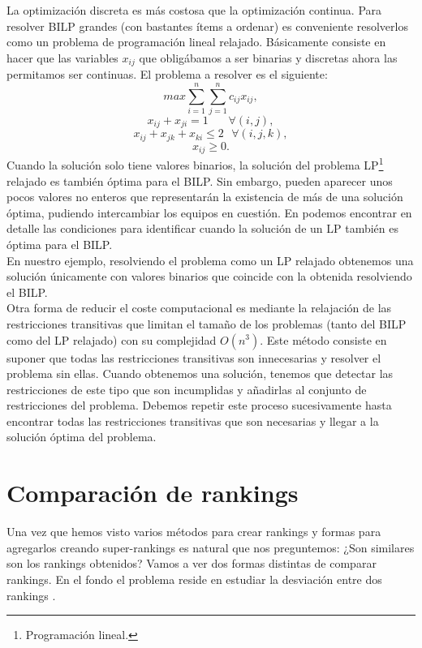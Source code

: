 La optimización discreta es más costosa que la optimización continua. Para resolver BILP grandes (con bastantes ítems a ordenar) es conveniente resolverlos como un problema de programación lineal relajado. Básicamente consiste en hacer que las variables $x_{ij}$ que obligábamos a ser binarias y discretas ahora las permitamos ser continuas. El problema a resolver es el siguiente:
\begin{equation} \label{optprob2}
	max \sum_{i=1}^{n} \sum_{j=1}^{n} c_{ij} x_{ij},
\end{equation}
\begin{equation*}
	x_{ij} + x_{ji} = 1 \ \ \ \ \ \ \ \ \forall (i,j),
\end{equation*}
\begin{equation*}
	x_{ij} + x_{jk} + x_{ki} \leq 2 \ \ \ \forall (i,j,k),
\end{equation*}
\begin{equation*}
	x_{ij} \geq 0.
\end{equation*}
Cuando la solución solo tiene valores binarios, la solución del problema LP\footnote{Programación lineal.} relajado es también óptima para el BILP. Sin embargo, pueden aparecer unos pocos valores no enteros que representarán la existencia de más de una solución óptima, pudiendo intercambiar los equipos en cuestión. En \cite[Chapter 4]{refbilp} podemos encontrar en detalle las condiciones para identificar cuando la solución de un LP también es óptima para el BILP.\\

En nuestro ejemplo, resolviendo el problema como un LP relajado obtenemos una solución únicamente con valores binarios que coincide con la obtenida resolviendo el BILP. \\

Otra forma de reducir el coste computacional es mediante la relajación de las restricciones transitivas que limitan el tamaño de los problemas (tanto del BILP como del LP relajado) con su complejidad $O(n^{3})$. Este método consiste en suponer que todas las restricciones transitivas son innecesarias y resolver el problema sin ellas. Cuando obtenemos una solución, tenemos que detectar las restricciones de este tipo que son incumplidas y añadirlas al conjunto de restricciones del problema. Debemos repetir este proceso sucesivamente hasta encontrar todas las restricciones transitivas que son necesarias y llegar a la solución óptima del problema.\\


\section{Comparación de rankings}
Una vez que hemos visto varios métodos para crear rankings y formas para agregarlos creando super-rankings es natural que nos preguntemos: ¿Son similares son los rankings obtenidos? Vamos a ver dos formas distintas de comparar rankings. En el fondo el problema reside en estudiar la desviación entre dos rankings \cite[Chapter 16]{libro_rankings}.

